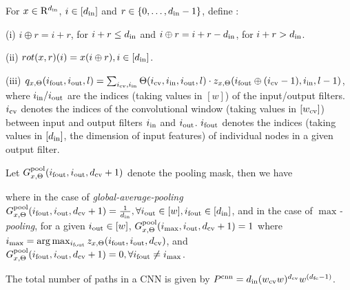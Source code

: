 \begin{definition}
For $x\in\mathrm{R}^{d_{\text{in}}}$, $i\in[d_{\text{in}}]$ and $r\in\{0,\ldots,d_{\text{in}}-1\}$, define :

(i) $i\oplus r = i+r$, for $i+r \leq d_{\text{in}}$ and $i\oplus r =i+r-d_{\text{in}}$, for $i+r>d_{\text{in}}$.

(ii) $rot(x,r)(i)=x(i\oplus r), i\in[d_{\text{in}}]$.

(iii) $q_{x,\Theta}(i_{\text{fout}},i_{\text{out}},l)=\sum_{i_{\text{cv}},i_{\text{in}}}\Theta(i_{\text{cv}},i_{\text{in}},i_{\text{out}},l)\cdot z_{x,\Theta}(i_{\text{fout}}\oplus (i_{\text{cv}}-1),i_{\text{in}},l-1)$, where $i_{\text{in}}/i_{\text{out}}$ are the indices (taking values in $[w]$) of the input/output filters. $i_{\text{cv}}$ denotes the indices of the convolutional window (taking values in $[w_{\text{cv}}]$) between input and output filters $i_{\text{in}}$ and $i_{\text{out}}$. $i_{\text{fout}}$ denotes the indices (taking values in $[d_{\text{in}}]$, the dimension of input features) of individual nodes in a given output filter.
\end{definition}
\begin{definition}[Pooling]\label{def:pooling}
Let $G^{\text{pool}}_{x,\Theta}(i_{\text{fout}},i_{\text{out}},d_{\text{cv}}+1)$ denote the pooling mask, then we have
\centerline{}
where in the case of \emph{global-average-pooling} $G^{\text{pool}}_{x,\Theta}(i_{\text{fout}},i_{\text{out}},d_{\text{cv}}+1)=\frac{1}{d_{\text{in}}},\forall i_{\text{out}}\in[w], i_{\text{fout}}\in[d_{\text{in}}]$, and in the case of \emph{$\max$-pooling},  
for a given $i_{\text{out}}\in[w]$, $G^{\text{pool}}_{x,\Theta}(i_{\max},i_{\text{out}},d_{\text{cv}}+1)=1$ where $i_{\max}=\arg\max_{i_{\text{fout}}}z_{x,\Theta}(i_{\text{fout}},i_{\text{out}},d_{\text{cv}})$, and $G^{\text{pool}}_{x,\Theta}(i_{\text{fout}},i_{\text{out}},d_{\text{cv}}+1)=0,\forall i_{\text{fout}}\neq i_{\max}$.
\end{definition}

\begin{proposition}
The total number of paths in a CNN is given by  $P^{\text{cnn}}=d_{\text{in}}(w_{\text{cv}} w)^{d_{\text{cv}}}w^{(d_{\text{fc}}-1)}$.
\end{proposition}

